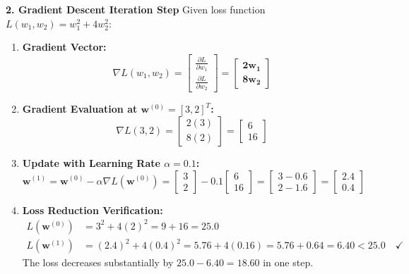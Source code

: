 \textbf{2. Gradient Descent Iteration Step}
Given loss function $L(w_1, w_2) = w_1^2 + 4 w_2^2$:
\begin{enumerate}
    \item \textbf{Gradient Vector:}
    \begin{equation*}
    \nabla L(w_1, w_2) = \begin{bmatrix} \frac{\partial L}{\partial w_1} \\ \frac{\partial L}{\partial w_2} \end{bmatrix} = \mathbf{\begin{bmatrix} 2w_1 \\ 8w_2 \end{bmatrix}}
    \end{equation*}
    \item \textbf{Gradient Evaluation at $\mathbf{w}^{(0)} = [3, 2]^T$:}
    \begin{equation*}
    \nabla L(3, 2) = \begin{bmatrix} 2(3) \\ 8(2) \end{bmatrix} = \begin{bmatrix} 6 \\ 16 \end{bmatrix}
    \end{equation*}
    \item \textbf{Update with Learning Rate $\alpha = 0.1$:}
    \begin{equation*}
    \mathbf{w}^{(1)} = \mathbf{w}^{(0)} - \alpha \nabla L(\mathbf{w}^{(0)}) = \begin{bmatrix} 3 \\ 2 \end{bmatrix} - 0.1 \begin{bmatrix} 6 \\ 16 \end{bmatrix} = \begin{bmatrix} 3 - 0.6 \\ 2 - 1.6 \end{bmatrix} = \mathbf{\begin{bmatrix} 2.4 \\ 0.4 \end{bmatrix}}
    \end{equation*}
    \item \textbf{Loss Reduction Verification:}
    \begin{align*}
    L(\mathbf{w}^{(0)}) &= 3^2 + 4(2)^2 = 9 + 16 = 25.0 \\
    L(\mathbf{w}^{(1)}) &= (2.4)^2 + 4(0.4)^2 = 5.76 + 4(0.16) = 5.76 + 0.64 = 6.40 < 25.0 \quad \checkmark
    \end{align*}
    The loss decreases substantially by $25.0 - 6.40 = 18.60$ in one step.
\end{enumerate}

